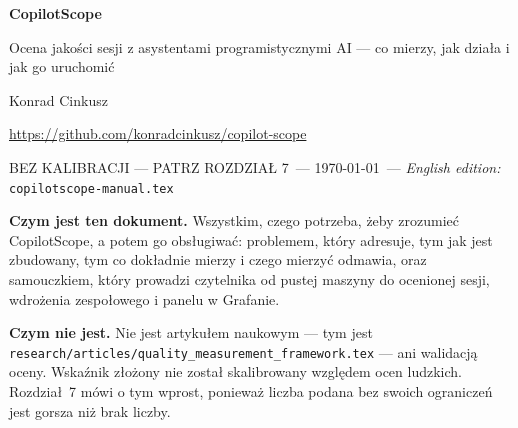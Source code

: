 \documentclass[11pt,a4paper]{article}
\newcommand{\docstatus}{BEZ KALIBRACJI --- PATRZ ROZDZIAŁ 7}
\begin{document}

\thispagestyle{plain}
\begin{center}
    {\LARGE\bfseries\sffamily\color{darkblue} CopilotScope}

    \vspace{0.3cm}

    {\Large\sffamily\color{darkgray} Ocena jako\'{s}ci sesji z asystentami
    programistycznymi AI --- co mierzy, jak dzia\l{}a i jak go uruchomi\'{c}}

    \vspace{0.6cm}

    {\large Konrad Cinkusz}

    \vspace{0.2cm}

    {\normalsize\color{darkgray} \url{https://github.com/konradcinkusz/copilot-scope}}

    \vspace{0.2cm}

    {\normalsize\color{accentred}\sffamily \docstatus\ --- \today\ ---
     \textit{English edition: } \texttt{copilotscope-manual.tex}}
\end{center}

\vspace{0.4cm}

\begin{center}
\begin{minipage}{0.92\linewidth}
\small
\textbf{Czym jest ten dokument.} Wszystkim, czego potrzeba, żeby zrozumieć
CopilotScope, a potem go obsługiwać: problemem, który adresuje, tym jak jest
zbudowany, tym co dokładnie mierzy i czego mierzyć odmawia, oraz samouczkiem,
który prowadzi czytelnika od pustej maszyny do ocenionej sesji, wdrożenia
zespołowego i panelu w Grafanie.

\textbf{Czym nie jest.} Nie jest artykułem naukowym --- tym jest
\texttt{research/articles/quality\_measurement\_framework.tex} --- ani
walidacją oceny. Wskaźnik złożony nie został skalibrowany względem ocen
ludzkich. Rozdział~7 mówi o tym wprost, ponieważ liczba podana bez swoich
ograniczeń jest gorsza niż brak liczby.
\end{minipage}
\end{center}

\vspace{0.5cm}
\end{document}
